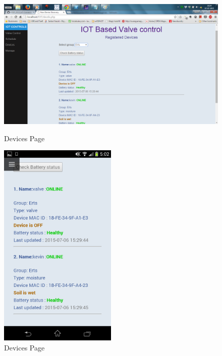 \documentclass[16pt]{article}
\begin{document}
	\begin{figure}
		\includegraphics[width=1\textwidth]{images/devices.png}
		\caption{Devices Page}
		\includegraphics[width=0.5\textwidth]{images/devices_page.png}
		\caption{Devices Page}
	\end{figure}
\end{document}
